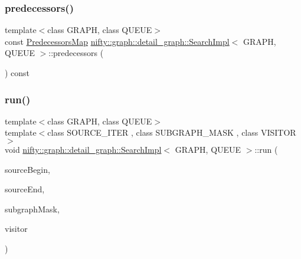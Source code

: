 \subsubsection{\texorpdfstring{predecessors()}{predecessors()}}
{\footnotesize\ttfamily template$<$class G\+R\+A\+PH, class Q\+U\+E\+UE$>$ \\
const \hyperlink{classnifty_1_1graph_1_1detail__graph_1_1SearchImpl_a23e9569c5680c5fd50f5f16235ef8016}{Predecessors\+Map} \hyperlink{classnifty_1_1graph_1_1detail__graph_1_1SearchImpl}{nifty\+::graph\+::detail\+\_\+graph\+::\+Search\+Impl}$<$ G\+R\+A\+PH, Q\+U\+E\+UE $>$\+::predecessors (\begin{DoxyParamCaption}{ }\end{DoxyParamCaption}) const\hspace{0.3cm}{\ttfamily [inline]}}

\mbox{\label{classnifty_1_1graph_1_1detail__graph_1_1SearchImpl_a8210b1709b1222c575b5c3e0a591be1f}} 
\subsubsection{\texorpdfstring{run()}{run()}}
{\footnotesize\ttfamily template$<$class G\+R\+A\+PH, class Q\+U\+E\+UE$>$ \\
template$<$class S\+O\+U\+R\+C\+E\+\_\+\+I\+T\+ER , class S\+U\+B\+G\+R\+A\+P\+H\+\_\+\+M\+A\+SK , class V\+I\+S\+I\+T\+OR $>$ \\
void \hyperlink{classnifty_1_1graph_1_1detail__graph_1_1SearchImpl}{nifty\+::graph\+::detail\+\_\+graph\+::\+Search\+Impl}$<$ G\+R\+A\+PH, Q\+U\+E\+UE $>$\+::run (\begin{DoxyParamCaption}\item[{S\+O\+U\+R\+C\+E\+\_\+\+I\+T\+ER}]{source\+Begin,  }\item[{S\+O\+U\+R\+C\+E\+\_\+\+I\+T\+ER}]{source\+End,  }\item[{const S\+U\+B\+G\+R\+A\+P\+H\+\_\+\+M\+A\+SK \&}]{subgraph\+Mask,  }\item[{V\+I\+S\+I\+T\+OR \&\&}]{visitor }\end{DoxyParamCaption})\hspace{0.3cm}{\ttfamily [inline]}}

